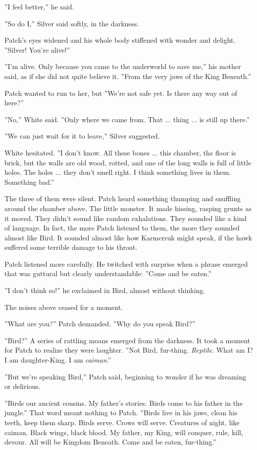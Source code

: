 \documentclass[12pt]{book}
\begin{document}
''I feel better,'' he said.

''So do I,'' Silver said softly, in the darkness.

Patch's eyes widened and his whole body stiffened with wonder and delight. ''Silver! You're alive!''

''I'm alive. Only because you came to the underworld to save me,'' his mother said, as if she did not quite believe it. ''From the very jaws of the King Beneath.''

Patch wanted to run to her, but %
''We're not safe yet. Is there any way out of here?''

''No,'' White said. ''Only where we came from. That ... thing ... is still up there.''

''We can just wait for it to leave,'' Silver suggested.

White hesitated. ''I don't know. All these bones ... this chamber, the floor is brick, but the walls are old wood, rotted, and one of the long walls is full of little holes. The holes ... they don't smell right. I think something lives in them. Something bad.''

The three of them were silent. Patch heard something thumping and snuffling around the chamber above. The little monster. It made hissing, rasping grunts as it moved. They didn't sound like random exhalations. They sounded like a kind of language. In fact, the more Patch listened to them, the more they sounded almost like Bird. It sounded almost like how Karmerruk might speak, if the hawk suffered some terrible damage to his throat.

Patch listened more carefully. He twitched with surprise when a phrase emerged that was guttural but clearly understandable: ''Come and be eaten.''

''I don't think so!'' he exclaimed in Bird, almost without thinking.

The noises above ceased for a moment.

''What are you?'' Patch demanded. ''Why do you speak Bird?''

''Bird?'' A series of rattling moans emerged from the darkness. It took a moment for Patch to realize they were laughter. ''Not Bird, fur-thing. {\it Reptile}. What am I? I am daughter-King. I am {\it caiman}.''

''But we're speaking Bird,'' Patch said, beginning to wonder if he was dreaming or delirious.

''Birds our ancient cousins. My father's stories. Birds come to his father in the jungle.'' That word meant nothing to Patch. ''Birds live in his jaws, clean his teeth, keep them sharp. Birds serve. Crows will serve. Creatures of night, like caiman. Black wings, black blood. My father, my King, will conquer, rule, kill, devour. All will be Kingdom Beneath. Come and be eaten, fur-thing.''
\end{document}
